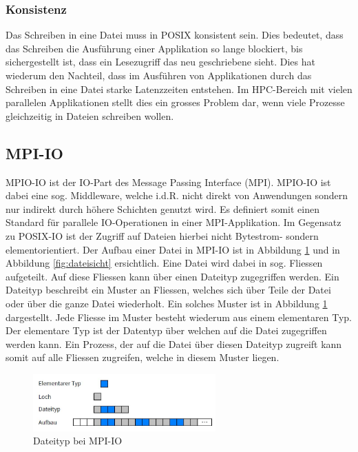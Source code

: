 \subsubsection{Konsistenz}
Das Schreiben in eine Datei muss in POSIX konsistent sein. Dies bedeutet, dass das Schreiben die Ausf\"uhrung einer Applikation so lange blockiert, bis sichergestellt ist, dass ein Lesezugriff das neu geschriebene sieht. Dies hat wiederum den Nachteil, dass im Ausführen von Applikationen durch das Schreiben in eine Datei starke Latenzzeiten entstehen. Im HPC-Bereich mit vielen parallelen Applikationen stellt dies ein grosses Problem dar, wenn viele Prozesse gleichzeitig in Dateien schreiben wollen.
\cite{Lockwood.11.09.2017}
\subsection{MPI-IO}
MPIO-IO ist der IO-Part des Message Passing Interface (MPI). MPIO-IO ist dabei eine sog. Middleware, welche i.d.R. nicht direkt von Anwendungen sondern nur indirekt durch h\"ohere Schichten genutzt wird. Es definiert somit einen Standard f\"ur parallele IO-Operationen in einer MPI-Applikation. Im Gegensatz zu POSIX-IO ist der Zugriff auf Dateien hierbei nicht Bytestrom- sondern elementorientiert. Der Aufbau einer Datei in MPI-IO ist in Abbildung \ref{fig:dateityp} und in Abbildung \ref{fig:dateisicht} ersichtlich. Eine Datei wird dabei in sog. Fliessen aufgeteilt. Auf diese Fliessen kann \"uber einen Dateityp zugegriffen werden. Ein Dateityp beschreibt ein Muster an Fliessen, welches sich \"uber Teile der Datei oder \"uber die ganze Datei wiederholt. Ein solches Muster ist in Abbildung \ref{fig:dateityp} dargestellt. Jede Fliesse im Muster besteht wiederum aus einem elementaren Typ. Der elementare Typ ist der Datentyp \"uber welchen auf die Datei zugegriffen werden kann. Ein Prozess, der auf die Datei \"uber diesen Dateityp zugreift kann somit auf alle Fliessen zugreifen, welche in diesem Muster liegen.


\begin{figure}[h]
	\centering
	\includegraphics[width=7cm]{fig/Dateityp.jpg}
	\caption{Dateityp bei MPI-IO \cite{Kuhn.13.05.2016}}
	\label{fig:dateityp}
\end{figure}

